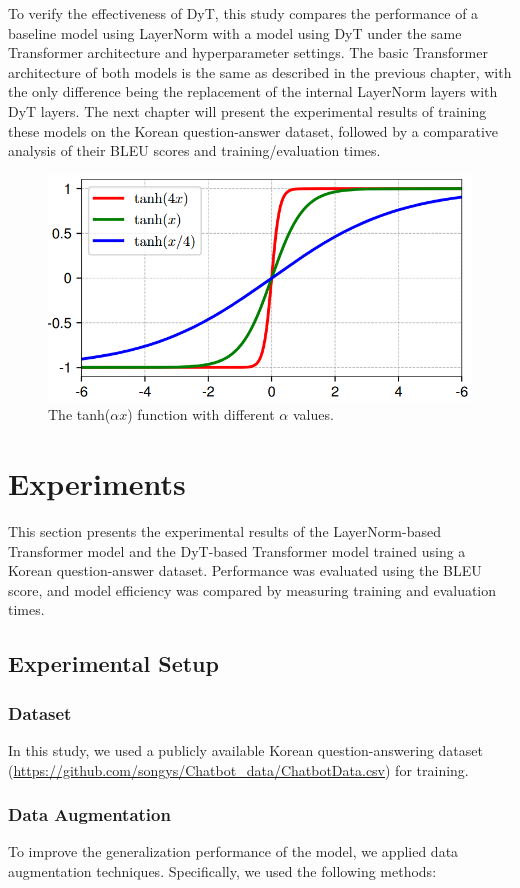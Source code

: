 \documentclass{article}
\begin{document}
To verify the effectiveness of DyT, this study compares the performance of a baseline model using LayerNorm with a model using DyT under the same Transformer architecture and hyperparameter settings. The basic Transformer architecture of both models is the same as described in the previous chapter, with the only difference being the replacement of the internal LayerNorm layers with DyT layers. The next chapter will present the experimental results of training these models on the Korean question-answer dataset, followed by a comparative analysis of their BLEU scores and training/evaluation times.


\begin{figure}
    \centering
    \includegraphics[width=0.5\linewidth]{figure_tanh_function.png}
    \caption{The tanh($\alpha x$) function with different $\alpha$ values.}    \label{fig:tanh}
\end{figure}

\section{Experiments}
This section presents the experimental results of the LayerNorm-based Transformer model and the DyT-based Transformer model trained using a Korean question-answer dataset. Performance was evaluated using the BLEU score, and model efficiency was compared by measuring training and evaluation times.

\subsection{Experimental Setup}
\subsubsection{Dataset}
In this study, we used a publicly available Korean question-answering dataset (\url{https://github.com/songys/Chatbot_data/ChatbotData.csv}) for training.

\subsubsection{Data Augmentation}
To improve the generalization performance of the model, we applied data augmentation techniques. Specifically, we used the following methods:
\end{document}
